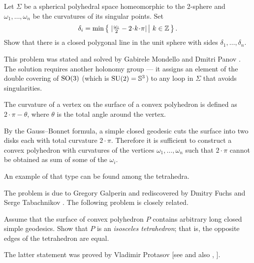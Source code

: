 \begin{pr}
Let $\Sigma$ be a spherical polyhedral space homeomorphic to the 2-sphere
and $\omega_1,\dots,\omega_n$ be the curvatures of its singular points.
Set
\[\delta_i=\min\set{|\tfrac{\omega_i}2-2\cdot k\cdot\pi|}{k\in\ZZ}.\]
Show that there is a closed polygonal line in the unit sphere with sides 
$\delta_1,\dots,\delta_n$.  
\end{pr}

This problem was stated and solved by Gabirele Mondello and Dmitri Panov \cite{mondello-panov}.
The solution requires another holonomy group ---
it assigns an element of the double covering of $\mathrm{SO}(3)$ (which is $\SU(2)\z=\mathbb{S}^3$) to any loop in $\Sigma$ that avoids singularities.


The curvature of a vertex on the surface of a convex polyhedron
is defined as $2\cdot\pi-\theta$, where $\theta$ is the total angle around the vertex.

By the Gauss--Bonnet formula, a simple closed geodesic cuts the surface into two disks each with total curvature $2\cdot\pi$.
Therefore it is sufficient to construct a convex polyhedron with curvatures of the vertices $\omega_1,\dots,\omega_n$ such that
$2\cdot\pi$ cannot be obtained as sum of some of the $\omega_i$.

An example of that type can be found among the tetrahedra.
\qeds

The problem is due to Gregory Galperin \cite{galperin} 
and rediscovered by Dmitry Fuchs and Serge Tabachnikov \cite[see 20.8 in][]{fuchs-tabachnikov}.
The following problem is closely related.

\begin{pr}
Assume that the surface of convex polyhedron $P$ contains arbitrary long closed simple geodesics. 
Show that $P$ is an \emph{isosceles tetrahedron};
that is, the opposite edges of the tetrahedron are equal.
\end{pr}

The latter statement was proved by Vladimir Protasov [see  and also , ].

